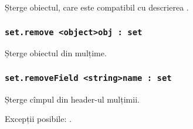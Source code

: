 Șterge obiectul, care este compatibil cu descrierea .

\subsubsection{\lstinline|set.remove <object>obj : set|}

Șterge obiectul  din mulțime.

\subsubsection{\lstinline|set.removeField <string>name : set|}

Șterge cîmpul  din header-ul mulțimii.

Excepții posibile: .

